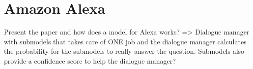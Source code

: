 \section{Amazon Alexa}
Present the paper and how does a model for Alexa works? => Dialogue manager with submodels that takes care of ONE job and the dialogue manager calculates the probability for the submodels to really answer the question. Submodels also provide a confidence score to help the dialogue manager?
